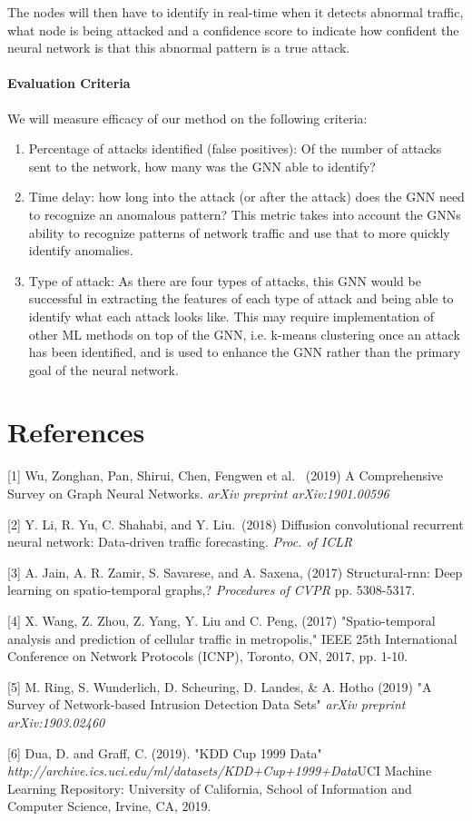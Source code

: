 \documentclass{article}
\begin{document}
The nodes will then have to identify in real-time when it detects abnormal traffic, what node is being attacked and a confidence score to indicate how confident the neural network is that this abnormal pattern is a true attack.

\paragraph{Evaluation Criteria} 
We will measure efficacy of our method on the following criteria:

\begin{enumerate}
    \item Percentage of attacks identified (false positives): Of the number of attacks sent to the network, how many was the GNN able to identify?
    \item Time delay: how long into the attack (or after the attack) does the GNN need to recognize an anomalous pattern? This metric takes into account the GNNs ability to recognize patterns of network traffic and use that to more quickly identify anomalies.
    \item Type of attack: As there are four types of attacks, this GNN would be successful in extracting the features of each type of attack and being able to identify what each attack looks like. This may require implementation of other ML methods on top of the GNN, i.e. k-means clustering once an attack has been identified, and is used to enhance the GNN rather than the primary goal of the neural network.
\end{enumerate}


\section*{References}

\medskip

\small


[1] Wu, Zonghan, Pan, Shirui, Chen, Fengwen et al. \ (2019) A Comprehensive Survey on Graph Neural
Networks.  {\it arXiv preprint arXiv:1901.00596}

[2] Y. Li, R. Yu, C. Shahabi, and Y. Liu.\ (2018) Diffusion convolutional recurrent
neural network: Data-driven traffic forecasting.  {\it Proc. of ICLR}

[3] A. Jain, A. R. Zamir, S. Savarese, and A. Saxena, (2017) Structural-rnn: Deep learning on spatio-temporal graphs,? {\it Procedures of CVPR} pp. 5308-5317.

[4] X. Wang, Z. Zhou, Z. Yang, Y. Liu and C. Peng, (2017) "Spatio-temporal analysis and prediction of cellular traffic in metropolis," IEEE 25th International Conference on Network Protocols (ICNP), Toronto, ON, 2017, pp. 1-10.

[5] M. Ring, S. Wunderlich, D. Scheuring, D. Landes, \& A. Hotho (2019) "A Survey of Network-based Intrusion Detection Data Sets" {\it arXiv preprint arXiv:1903.02460}

[6] Dua, D. and Graff, C. (2019). "KDD Cup 1999 Data" \\ {\it http://archive.ics.uci.edu/ml/datasets/KDD+Cup+1999+Data}UCI Machine Learning Repository: University of California, School of Information and Computer Science, Irvine, CA, 2019. 
\end{document}
